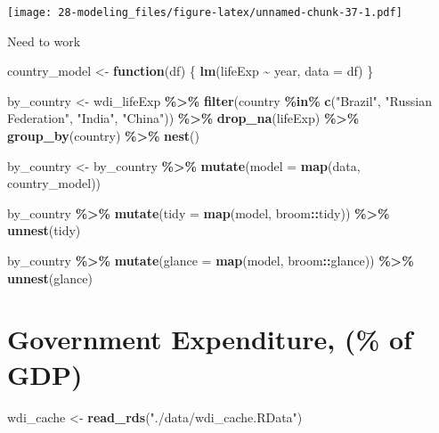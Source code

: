 \documentclass[
  xelatex, ja=standard]{bxjsbook}
\newenvironment{Shaded}{\begin{snugshade}}{\end{snugshade}}
\newcommand{\AttributeTok}[1]{\textcolor[rgb]{0.13,0.29,0.53}{#1}}
\newcommand{\ControlFlowTok}[1]{\textcolor[rgb]{0.13,0.29,0.53}{\textbf{#1}}}
\newcommand{\FunctionTok}[1]{\textcolor[rgb]{0.13,0.29,0.53}{\textbf{#1}}}
\newcommand{\NormalTok}[1]{#1}
\newcommand{\OtherTok}[1]{\textcolor[rgb]{0.56,0.35,0.01}{#1}}
\newcommand{\SpecialCharTok}[1]{\textcolor[rgb]{0.81,0.36,0.00}{\textbf{#1}}}
\newcommand{\StringTok}[1]{\textcolor[rgb]{0.31,0.60,0.02}{#1}}
\theoremstyle{definition}
\theoremstyle{definition}
\theoremstyle{definition}
\theoremstyle{definition}
\theoremstyle{remark}
\begin{document}
\texttt{[image: 28-modeling\_files/figure-latex/unnamed-chunk-37-1.pdf]}

Need to work

\begin{Shaded}
\begin{Highlighting}[]
\NormalTok{country\_model }\OtherTok{\textless{}{-}} \ControlFlowTok{function}\NormalTok{(df) \{}
  \FunctionTok{lm}\NormalTok{(lifeExp }\SpecialCharTok{\textasciitilde{}}\NormalTok{ year, }\AttributeTok{data =}\NormalTok{ df)}
\NormalTok{\}}

\NormalTok{by\_country }\OtherTok{\textless{}{-}}\NormalTok{ wdi\_lifeExp }\SpecialCharTok{\%\textgreater{}\%} \FunctionTok{filter}\NormalTok{(country }\SpecialCharTok{\%in\%} \FunctionTok{c}\NormalTok{(}\StringTok{"Brazil"}\NormalTok{, }\StringTok{"Russian Federation"}\NormalTok{, }\StringTok{"India"}\NormalTok{, }\StringTok{"China"}\NormalTok{)) }\SpecialCharTok{\%\textgreater{}\%} \FunctionTok{drop\_na}\NormalTok{(lifeExp) }\SpecialCharTok{\%\textgreater{}\%} \FunctionTok{group\_by}\NormalTok{(country) }\SpecialCharTok{\%\textgreater{}\%} \FunctionTok{nest}\NormalTok{()}

\NormalTok{by\_country }\OtherTok{\textless{}{-}}\NormalTok{ by\_country }\SpecialCharTok{\%\textgreater{}\%} 
  \FunctionTok{mutate}\NormalTok{(}\AttributeTok{model =} \FunctionTok{map}\NormalTok{(data, country\_model))}

\NormalTok{by\_country }\SpecialCharTok{\%\textgreater{}\%} 
  \FunctionTok{mutate}\NormalTok{(}\AttributeTok{tidy =} \FunctionTok{map}\NormalTok{(model, broom}\SpecialCharTok{::}\NormalTok{tidy)) }\SpecialCharTok{\%\textgreater{}\%} 
  \FunctionTok{unnest}\NormalTok{(tidy)}

\NormalTok{by\_country }\SpecialCharTok{\%\textgreater{}\%} 
  \FunctionTok{mutate}\NormalTok{(}\AttributeTok{glance =} \FunctionTok{map}\NormalTok{(model, broom}\SpecialCharTok{::}\NormalTok{glance)) }\SpecialCharTok{\%\textgreater{}\%} 
  \FunctionTok{unnest}\NormalTok{(glance)}
\end{Highlighting}
\end{Shaded}

\hypertarget{government-expenditure-of-gdp}{%
\section{Government Expenditure, (\% of GDP)}\label{government-expenditure-of-gdp}}

\begin{Shaded}
\begin{Highlighting}[]
\NormalTok{wdi\_cache }\OtherTok{\textless{}{-}} \FunctionTok{read\_rds}\NormalTok{(}\StringTok{"./data/wdi\_cache.RData"}\NormalTok{)}
\end{Highlighting}
\end{Shaded}
\end{document}
